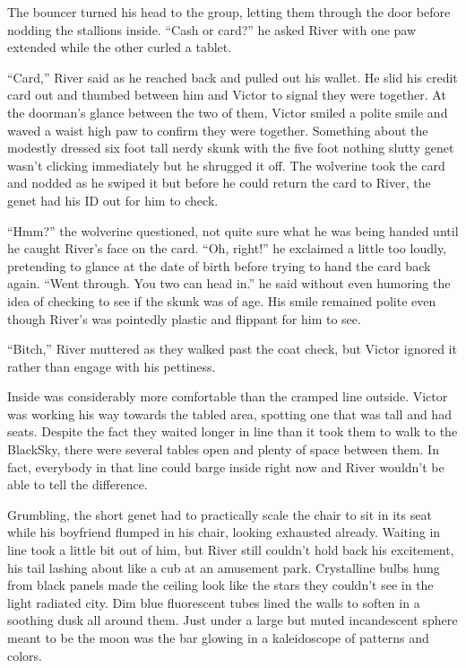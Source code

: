 The bouncer turned his head to the group, letting them through the door
before nodding the stallions inside. ``Cash or card?'' he asked River
with one paw extended while the other curled a tablet.

``Card,'' River said as he reached back and pulled out his wallet. He
slid his credit card out and thumbed between him and Victor to signal
they were together. At the doorman's glance between the two of them,
Victor smiled a polite smile and waved a waist high paw to confirm they
were together. Something about the modestly dressed six foot tall nerdy
skunk with the five foot nothing slutty genet wasn't clicking
immediately but he shrugged it off. The wolverine took the card and
nodded as he swiped it but before he could return the card to River, the
genet had his ID out for him to check.

``Hmm?'' the wolverine questioned, not quite sure what he was being
handed until he caught River's face on the card. ``Oh, right!'' he
exclaimed a little too loudly, pretending to glance at the date of birth
before trying to hand the card back again. ``Went through. You two can
head in.'' he said without even humoring the idea of checking to see if
the skunk was of age. His smile remained polite even though River's was
pointedly plastic and flippant for him to see.

``Bitch,'' River muttered as they walked past the coat check, but Victor
ignored it rather than engage with his pettiness.

Inside was considerably more comfortable than the cramped line outside.
Victor was working his way towards the tabled area, spotting one that
was tall and had seats. Despite the fact they waited longer in line than
it took them to walk to the BlackSky, there were several tables open and
plenty of space between them. In fact, everybody in that line could
barge inside right now and River wouldn't be able to tell the
difference.

Grumbling, the short genet had to practically scale the chair to sit in
its seat while his boyfriend flumped in his chair, looking exhausted
already. Waiting in line took a little bit out of him, but River still
couldn't hold back his excitement, his tail lashing about like a cub at
an amusement park. Crystalline bulbs hung from black panels made the
ceiling look like the stars they couldn't see in the light radiated
city. Dim blue fluorescent tubes lined the walls to soften in a soothing
dusk all around them. Just under a large but muted incandescent sphere
meant to be the moon was the bar glowing in a kaleidoscope of patterns
and colors.

